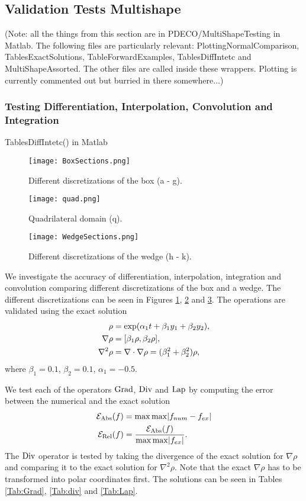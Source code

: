 \subsection{Validation Tests Multishape}
(Note: all the things from this section are in PDECO/MultiShapeTesting in Matlab. The following files are particularly relevant:
PlottingNormalComparison, TablesExactSolutions, TableForwardExamples, TablesDiffIntetc and MultiShapeAssorted. The other files are called inside these wrappers. Plotting is currently commented out but burried in there somewhere...)

\subsubsection{Testing Differentiation, Interpolation, Convolution and Integration} \label{sec:ValidationDiffIntetc}
TablesDiffIntetc() in Matlab
	\begin{figure}[h]
	\centering
	\texttt{[image: BoxSections.png]}
	\caption{Different discretizations of the box (a - g).} 
	\label{F2}
\end{figure}
\begin{figure}[h]
	\centering
	\texttt{[image: quad.png]}
	\caption{Quadrilateral domain (q).} 
	\label{F3a}
\end{figure}
\begin{figure}[h]
	\centering
	\texttt{[image: WedgeSections.png]}
	\caption{Different discretizations of the wedge (h - k).} 
	\label{F4}
\end{figure}


We investigate the accuracy of differentiation, interpolation, integration and convolution comparing different discretizations of the box and a wedge. The different discretizations can be seen in Figures \ref{F2}, \ref{F3a} and \ref{F4}.
The operations are validated using the exact solution
\begin{align}\label{eq:exactsol1}
	\rho &= \exp( \alpha_1  t + \beta_1 y_1 + \beta_2 y_2),\\
	\nabla \rho &= [\beta_1 \rho, \beta_2 \rho],\notag \\
	\nabla^2 \rho &= \nabla \cdot \nabla \rho = (\beta_1^2 + \beta_2^2)\rho,\notag
\end{align}
where $	\beta_1 = 0.1 $, $\beta_2 = 0.1$, $\alpha_1 = -0.5$.


We test each of the operators $\operatorname{Grad}$, $\operatorname{Div}$ and $\operatorname{Lap}$ by computing the error between the numerical and the exact solution
\begin{align}\label{eq:ErrorMeasure1}
	\mathcal E_{\text{Abs}} (f)&= \max \max \abs{f_{num} - f_{ex}}\\
	\mathcal E_{\text{Rel}} (f)&= \frac{\mathcal E_{\text{Abs}}(f) }{ \max \max \abs{f_{ex}}}.
\end{align}
The $\operatorname{Div}$ operator is tested by taking the divergence of the exact solution for $\nabla \rho$ and comparing it to the exact solution for $\nabla^2 \rho$. Note that the exact $\nabla \rho$ has to be transformed into polar coordinates first. The solutions can be seen in Tables \ref{Tab:Grad}, \ref{Tab:div} and \ref{Tab:Lap}.

